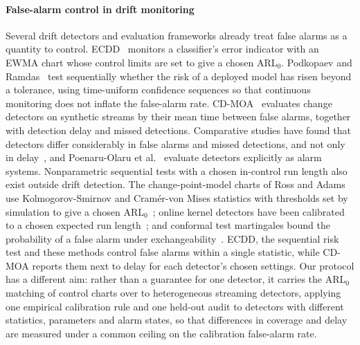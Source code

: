 \documentclass[preprint,12pt]{elsarticle}
\begin{document}
\paragraph{False-alarm control in drift monitoring} Several drift detectors and evaluation frameworks already treat false alarms as a quantity to control. ECDD~\cite{ross2012ewma} monitors a classifier's error indicator with an EWMA chart whose control limits are set to give a chosen ARL$_0$. Podkopaev and Ramdas~\cite{podkopaev2022tracking} test sequentially whether the risk of a deployed model has risen beyond a tolerance, using time-uniform confidence sequences so that continuous monitoring does not inflate the false-alarm rate. CD-MOA~\cite{bifet2013cdmoa} evaluates change detectors on synthetic streams by their mean time between false alarms, together with detection delay and missed detections. Comparative studies have found that detectors differ considerably in false alarms and missed detections, and not only in delay~\cite{gonccalves2014comparative,barros2018large}, and Poenaru-Olaru et al.~\cite{poenaru2022concept} evaluate detectors explicitly as alarm systems. Nonparametric sequential tests with a chosen in-control run length also exist outside drift detection. The change-point-model charts of Ross and Adams use Kolmogorov-Smirnov and Cram\'er-von Mises statistics with thresholds set by simulation to give a chosen ARL$_0$~\cite{ross2012cpm,ross2015cpm}; online kernel detectors have been calibrated to a chosen expected run length~\cite{cobb2022sequential}; and conformal test martingales bound the probability of a false alarm under exchangeability~\cite{vovk2003testing,volkhonskiy2017inductive}. ECDD, the sequential risk test and these methods control false alarms within a single statistic, while CD-MOA reports them next to delay for each detector's chosen settings. Our protocol has a different aim: rather than a guarantee for one detector, it carries the ARL$_0$ matching of control charts over to heterogeneous streaming detectors, applying one empirical calibration rule and one held-out audit to detectors with different statistics, parameters and alarm states, so that differences in coverage and delay are measured under a common ceiling on the calibration false-alarm rate.
\end{document}

